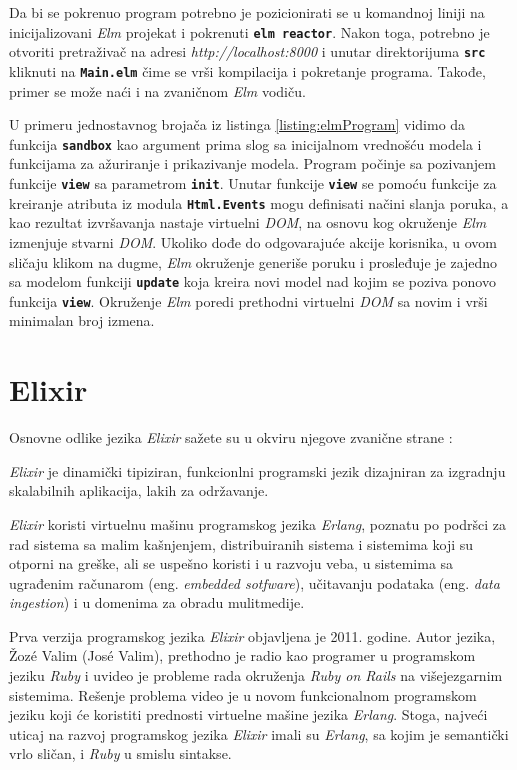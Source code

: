 \documentclass[12pt,oneside]{memoir}
\begin{document}
Da bi se pokrenuo program potrebno je pozicionirati se u komandnoj liniji na inicijalizovani
\emph{Elm} projekat i pokrenuti \texttt{\textbf{elm reactor}}. Nakon toga, potrebno je otvoriti pretraživač na
adresi \emph{http://localhost:8000} i unutar direktorijuma \texttt{\textbf{src}} kliknuti na 
\texttt{\textbf{Main.elm}} čime se vrši kompilacija i pokretanje programa. Takođe, primer se
može naći i na zvaničnom \emph{Elm} vodiču\cite{elm-program}.

U primeru jednostavnog brojača iz listinga \ref{listing:elmProgram} vidimo da funkcija
\textbf{\texttt{sandbox}} kao argument prima slog sa inicijalnom vrednošću modela i 
funkcijama za ažuriranje i prikazivanje modela. Program počinje sa pozivanjem funkcije
\texttt{\textbf{view}} sa parametrom \texttt{\textbf{init}}. Unutar funkcije
\texttt{\textbf{view}} se pomoću funkcije za kreiranje atributa iz modula
\texttt{\textbf{Html.Events}} mogu definisati načini slanja poruka, a kao rezultat 
izvršavanja nastaje virtuelni \emph{DOM}, na osnovu kog okruženje \emph{Elm} izmenjuje stvarni \emph{DOM}.
Ukoliko dođe do odgovarajuće akcije korisnika, u ovom sličaju klikom na dugme, \emph{Elm} okruženje
generiše poruku i prosleđuje je zajedno sa modelom funkciji \texttt{\textbf{update}} koja
kreira novi model nad kojim se poziva ponovo funkcija \texttt{\textbf{view}}.
Okruženje \emph{Elm} poredi prethodni virtuelni \emph{DOM} sa novim i vrši minimalan broj izmena.  

\chapter{Elixir}
Osnovne odlike jezika \emph{Elixir} sažete su u okviru njegove zvanične strane \cite{elixir}:
\begin{displayquote}
\emph{Elixir} je dinamički tipiziran, funkcionlni programski jezik dizajniran za izgradnju skalabilnih
aplikacija, lakih za održavanje.

\emph{Elixir} koristi virtuelnu mašinu programskog jezika \emph{Erlang}, poznatu po podršci za rad sistema sa malim kašnjenjem,
distribuiranih sistema i sistemima koji su otporni na greške, ali se uspešno koristi i u razvoju
veba, u sistemima sa ugrađenim računarom (eng. \emph{embedded sotfware}), učitavanju podataka
(eng. \emph{data ingestion}) i u domenima za obradu mulitmedije.
\end{displayquote}

Prva verzija programskog jezika \emph{Elixir} objavljena je 2011. godine. Autor jezika, Žozé Valim
(José Valim), prethodno je radio kao programer u programskom jeziku \emph{Ruby} i uvideo je probleme rada
okruženja \emph{Ruby on Rails} na višejezgarnim sistemima. Rešenje problema video je u novom funkcionalnom
programskom jeziku koji će koristiti prednosti virtuelne mašine jezika \emph{Erlang}. Stoga, najveći
uticaj na razvoj programskog jezika \emph{Elixir} imali su \emph{Erlang}, sa kojim je semantički vrlo sličan,
i \emph{Ruby} u smislu sintakse. 
\end{document}
